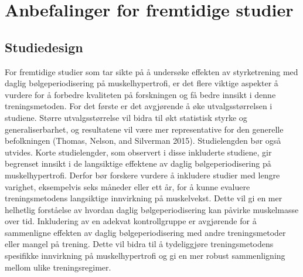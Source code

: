 \documentclass[
  letterpaper,
  DIV=11,
  numbers=noendperiod]{scrreprt}
\begin{document}
\hypertarget{anbefalinger-for-fremtidige-studier}{%
\section{Anbefalinger for fremtidige
studier}\label{anbefalinger-for-fremtidige-studier}}

\hypertarget{studiedesign-2}{%
\subsection{Studiedesign}\label{studiedesign-2}}

For fremtidige studier som tar sikte på å undersøke effekten av
styrketrening med daglig bølgeperiodisering på muskelhypertrofi, er det
flere viktige aspekter å vurdere for å forbedre kvaliteten på
forskningen og få bedre innsikt i denne treningsmetoden. For det første
er det avgjørende å øke utvalgsstørrelsen i studiene. Større
utvalgsstørrelse vil bidra til økt statistisk styrke og
generaliserbarhet, og resultatene vil være mer representative for den
generelle befolkningen (Thomas, Nelson, and Silverman 2015).
Studielengden bør også utvides. Korte studielengder, som observert i
disse inkluderte studiene, gir begrenset innsikt i de langsiktige
effektene av daglig bølgeperiodisering på muskelhypertrofi. Derfor bør
forskere vurdere å inkludere studier med lengre varighet, eksempelvis
seks måneder eller ett år, for å kunne evaluere treningsmetodens
langsiktige innvirkning på muskelvekst. Dette vil gi en mer helhetlig
forståelse av hvordan daglig bølgeperiodisering kan påvirke muskelmasse
over tid. Inkludering av en adekvat kontrollgruppe er avgjørende for å
sammenligne effekten av daglig bølgeperiodisering med andre
treningsmetoder eller mangel på trening. Dette vil bidra til å
tydeliggjøre treningsmetodens spesifikke innvirkning på muskelhypertrofi
og gi en mer robust sammenligning mellom ulike treningsregimer.
\end{document}
